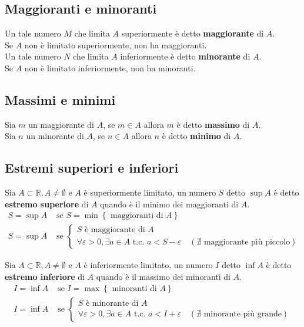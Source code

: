 \documentclass[a4paper]{article}
\begin{document}
\subsection{Maggioranti e minoranti}
Un tale numero \(M\) che limita \(A\) superiormente è detto \textbf{maggiorante} di \(A\). \\
Se \(A\) non è limitato superiormente, non ha maggioranti. \\
Un tale numero \(N\) che limita \(A\) inferiormente è detto \textbf{minorante} di \(A\). \\
Se \(A\) non è limitato inferiormente, non ha minoranti.


\subsection{Massimi e minimi}
Sia \(m\) un maggiorante di \(A\), se \(m \in A\) allora \(m\) è detto \textbf{massimo} di \(A\). \\
Sia \(n\) un minorante di \(A\), se \(n \in A\) allora \(n\) è detto \textbf{minimo} di \(A\).
	

\subsection{Estremi superiori e inferiori}
Sia \(A \subset \mathbb{R}, A \neq \emptyset\) e \(A\) è superiormente limitato, un numero \(S\) detto \(\sup A\) è detto \textbf{estremo superiore} di \(A\) quando è il minimo dei maggioranti di \(A\).
\begin{align*}
	\tag{definizione}
	S = \sup A &\text{ se } S = \min \left\{ \text{ maggioranti di } A \right\} \\
	\tag{caratterizzazione}
	S = \sup A &\text{ se }
	\begin{cases}
		S \text{ è maggiorante di } A \\
		\forall \varepsilon > 0, \exists a \in A \text{ t.c. } a < S - \varepsilon \quad \left( \nexists \text{ maggiorante più piccolo} \right)
	\end{cases}
\end{align*}

Sia \(A \subset \mathbb{R}, A \neq \emptyset\) e \(A\) è inferiormente limitato, un numero \(I\) detto \(\inf A\) è detto \textbf{estremo inferiore} di \(A\) quando è il massimo dei minoranti di \(A\).
\begin{align*}
	\tag{definizione}
	I = \inf A &\text{ se } I = \max \left\{ \text{ minoranti di } A \right\} \\
	\tag{caratterizzazione}
	I = \inf A &\text{ se }
	\begin{cases}
		S \text{ è minorante di } A \\
		\forall \varepsilon > 0, \exists a \in A \text{ t.c. } a < I + \varepsilon \quad \left( \nexists \text{ minorante più grande} \right)
	\end{cases}
\end{align*}
\end{document}
